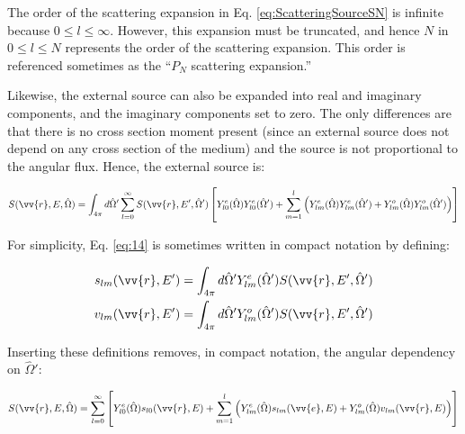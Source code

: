 \documentclass[10pt]{article}
\begin{document}
\begin{flushleft}
The order of the scattering expansion in Eq. \eqref{eq:ScatteringSourceSN} is infinite because \(0\leq l\leq\infty\). However, this expansion must be truncated, and hence \(N\) in \(0\leq l\leq N\) represents the order of the scattering expansion. This order is referenced sometimes as the ``\(P_N\) scattering expansion.'' 

Likewise, the external source can also be expanded into real and imaginary components, and the imaginary components set to zero. The only differences are that there is no cross section moment present (since an external source does not depend on any cross section of the medium) and the source is not proportional to the angular flux. Hence, the external source is:

\begin{equation}
\label{eq:14}
S(\vv{r},E, \hat{\Omega})=\int_{4\pi}^{}d\hat{\Omega}'\sum_{l=0}^{\infty}S(\vv{r},E', \hat{\Omega}')\left\lbrack Y_{l0}^e(\hat{\Omega})Y_{l0}^e(\hat{\Omega}')+\sum_{m=1}^{l}\left(Y_{lm}^e(\hat{\Omega})Y_{lm}^{e}(\hat{\Omega}')+Y_{lm}^o(\hat{\Omega})Y_{lm}^{o}(\hat{\Omega}')\right)\right\rbrack 
\end{equation}

\begin{tcolorbox}[breakable]
For simplicity, Eq. \eqref{eq:14} is sometimes written in compact notation by defining:

\begin{equation}
\begin{aligned}
s_{lm}(\vv{r},E')=\int_{4\pi}^{}d\hat{\Omega}'Y_{lm}^e(\hat{\Omega}')S(\vv{r}, E',\hat{\Omega}')\\
v_{lm}(\vv{r},E')=\int_{4\pi}^{}d\hat{\Omega}'Y_{lm}^o(\hat{\Omega}')S(\vv{r}, E',\hat{\Omega}')\\
\end{aligned}
\end{equation}

Inserting these definitions removes, in compact notation, the angular dependency on \(\hat{\Omega}'\):

\begin{equation}
\label{eq:ExternalSourceSNSimple}
\begin{aligned}
S(\vv{r},E, \hat{\Omega})=\sum_{l=0}^{\infty}\left\lbrack Y_{l0}^e(\hat{\Omega})s_{l0}(\vv{r},E)+\sum_{m=1}^{l}\left(Y_{lm}^e(\hat{\Omega})s_{lm}(\vv{e},E)+Y_{lm}^o(\hat{\Omega})v_{lm}(\vv{r},E)\right)\right\rbrack
\end{aligned}
\end{equation}
\end{tcolorbox}


\end{flushleft}
\end{document}
